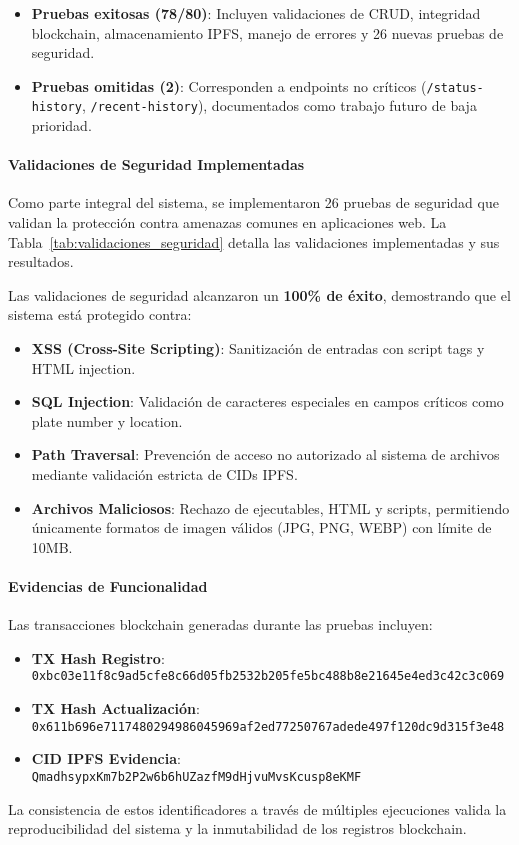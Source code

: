 \begin{itemize}
    \item \textbf{Pruebas exitosas (78/80)}: Incluyen validaciones de CRUD, integridad blockchain, almacenamiento IPFS, manejo de errores y 26 nuevas pruebas de seguridad.
    \item \textbf{Pruebas omitidas (2)}: Corresponden a endpoints no críticos (\texttt{/status-history}, \texttt{/recent-history}), documentados como trabajo futuro de baja prioridad.
\end{itemize}

\paragraph{Validaciones de Seguridad Implementadas}
Como parte integral del sistema, se implementaron 26 pruebas de seguridad que validan la protección contra amenazas comunes en aplicaciones web. La Tabla~\ref{tab:validaciones_seguridad} detalla las validaciones implementadas y sus resultados.



Las validaciones de seguridad alcanzaron un \textbf{100\% de éxito}, demostrando que el sistema está protegido contra:

\begin{itemize}
    \item \textbf{XSS (Cross-Site Scripting)}: Sanitización de entradas con script tags y HTML injection.
    \item \textbf{SQL Injection}: Validación de caracteres especiales en campos críticos como plate number y location.
    \item \textbf{Path Traversal}: Prevención de acceso no autorizado al sistema de archivos mediante validación estricta de CIDs IPFS.
    \item \textbf{Archivos Maliciosos}: Rechazo de ejecutables, HTML y scripts, permitiendo únicamente formatos de imagen válidos (JPG, PNG, WEBP) con límite de 10MB.
\end{itemize}

\paragraph{Evidencias de Funcionalidad}
Las transacciones blockchain generadas durante las pruebas incluyen:

\begin{itemize}
    \item \textbf{TX Hash Registro}: \texttt{0xbc03e11f8c9ad5cfe8c66d05fb2532b205fe5bc488b8e21645e4ed3c42c3c069}
    \item \textbf{TX Hash Actualización}: \texttt{0x611b696e7117480294986045969af2ed77250767adede497f120dc9d315f3e48}
    \item \textbf{CID IPFS Evidencia}: \texttt{QmadhsypxKm7b2P2w6b6hUZazfM9dHjvuMvsKcusp8eKMF}
\end{itemize}

La consistencia de estos identificadores a través de múltiples ejecuciones valida la reproducibilidad del sistema y la inmutabilidad de los registros blockchain. 
